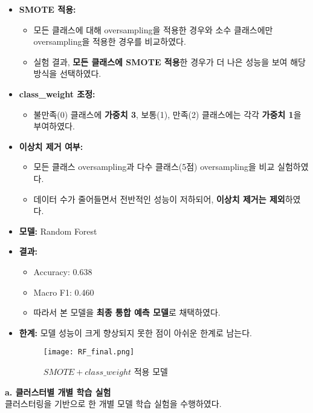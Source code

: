 \documentclass[sigconf]{acmart}
\begin{document}
\begin{CJK}{UTF8}{mj}
\begin{itemize}
  \item \textbf{SMOTE 적용:}
  \begin{itemize}
    \item 모든 클래스에 대해 oversampling을 적용한 경우와 소수 클래스에만 oversampling을 적용한 경우를 비교하였다.
    \item 실험 결과, \textbf{모든 클래스에 SMOTE 적용}한 경우가 더 나은 성능을 보여 해당 방식을 선택하였다.
  \end{itemize}
  \item \textbf{class\_weight 조정:}
  \begin{itemize}
    \item 불만족(0) 클래스에 \textbf{가중치 3}, 보통(1), 만족(2) 클래스에는 각각 \textbf{가중치 1}을 부여하였다.
  \end{itemize}
  \item \textbf{이상치 제거 여부:}
  \begin{itemize}
    \item 모든 클래스 oversampling과 다수 클래스(5점) oversampling을 비교 실험하였다.
    \item 데이터 수가 줄어들면서 전반적인 성능이 저하되어, \textbf{이상치 제거는 제외}하였다.
  \end{itemize}
  \item \textbf{모델:} Random Forest
  \item \textbf{결과:}
  \begin{itemize}
    \item Accuracy: 0.638
    \item Macro F1: 0.460
    \item 따라서 본 모델을 \textbf{최종 통합 예측 모델}로 채택하였다.
  \end{itemize}
  \item \textbf{한계:} 모델 성능이 크게 향상되지 못한 점이 아쉬운 한계로 남는다.
      \begin{figure}[H]
      \centering
      \texttt{[image: RF\_final.png]}
      \caption{$SMOTE + class\_weight$ 적용 모델}
      \label{fig:random forest adopted}
      \end{figure}
\end{itemize}

\vspace{0.5em}
\noindent\textbf{a. 클러스터별 개별 학습 실험}\mbox{}\\
클러스터링을 기반으로 한 개별 모델 학습 실험을 수행하였다.


\end{CJK}
\end{document}
